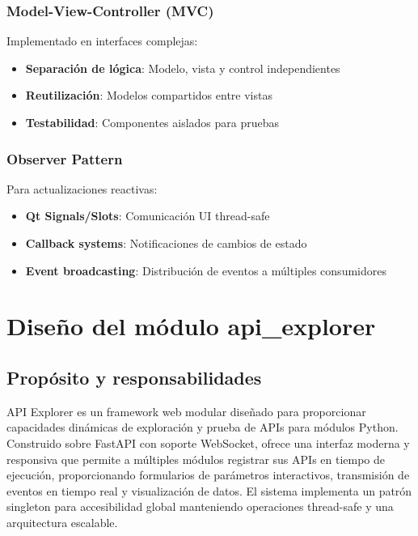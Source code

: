 \subsubsection{Model-View-Controller (MVC)}
Implementado en interfaces complejas:

\begin{itemize}
    \item \textbf{Separación de lógica}: Modelo, vista y control independientes
    \item \textbf{Reutilización}: Modelos compartidos entre vistas
    \item \textbf{Testabilidad}: Componentes aislados para pruebas
\end{itemize}

\subsubsection{Observer Pattern}
Para actualizaciones reactivas:

\begin{itemize}
    \item \textbf{Qt Signals/Slots}: Comunicación UI thread-safe
    \item \textbf{Callback systems}: Notificaciones de cambios de estado
    \item \textbf{Event broadcasting}: Distribución de eventos a múltiples consumidores
\end{itemize}

\section{Diseño del módulo api\_explorer}
\label{sec:diseno_api_explorer}

\subsection{Propósito y responsabilidades}
\label{subsec:proposito_api_explorer}

API Explorer es un framework web modular diseñado para proporcionar capacidades dinámicas de exploración y prueba de APIs para módulos Python. Construido sobre FastAPI con soporte WebSocket, ofrece una interfaz moderna y responsiva que permite a múltiples módulos registrar sus APIs en tiempo de ejecución, proporcionando formularios de parámetros interactivos, transmisión de eventos en tiempo real y visualización de datos. El sistema implementa un patrón singleton para accesibilidad global manteniendo operaciones thread-safe y una arquitectura escalable.

